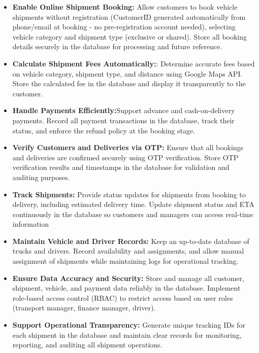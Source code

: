\documentclass[12pt,a4paper]{article}
\begin{document}
\begin{itemize}

\item \textbf{Enable Online Shipment Booking:} Allow customers to book vehicle shipments without registration (CustomerID generated automatically from phone/email at booking - no pre-registration account needed), selecting vehicle category and shipment type (exclusive or shared). Store all booking details securely in the database for processing and future reference.

\item \textbf{Calculate Shipment Fees Automatically:}: Determine accurate fees based on vehicle category, shipment type, and distance using Google Maps API. Store the calculated fee in the database and display it transparently to the customer.
\item \textbf{Handle Payments Efficiently:}Support advance and cash-on-delivery payments. Record all payment transactions in the database, track their status, and enforce the refund policy at the booking stage.
\item \textbf{Verify Customers and Deliveries via OTP: }Ensure that all bookings and deliveries are confirmed securely using OTP verification. Store OTP verification results and timestamps in the database for validation and auditing purposes.
\item \textbf{Track Shipments: }Provide status updates for shipments from booking to delivery, including estimated delivery time. Update shipment status and ETA continuously in the database so customers and managers can access real-time information
\item \textbf{Maintain Vehicle and Driver Records: }Keep an up-to-date database of trucks and drivers. Record availability and assignments, and allow manual assignment of shipments while maintaining logs for operational tracking.
\item \textbf{Ensure Data Accuracy and Security: }Store and manage all customer, shipment, vehicle, and payment data reliably in the database. Implement role-based access control (RBAC) to restrict access based on user roles (transport manager, finance manager, driver).
\item \textbf{Support Operational Transparency: }Generate unique tracking IDs for each shipment in the database and maintain clear records for monitoring, reporting, and auditing all shipment operations.


\end{itemize}
\end{document}
